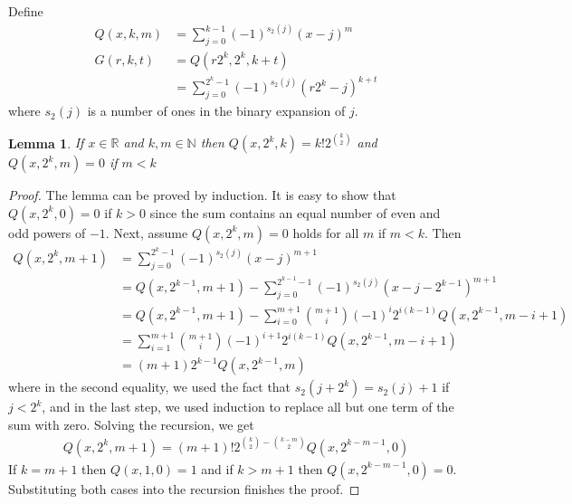 \documentclass{article}
\newtheorem{lemma}{Lemma}
\begin{document}
Define
\begin{align}
Q(x, k, m)
&=
  \sum_{j=0}^{k-1}
    (-1)^{s_2(j)}
    \left(x-j\right)^{m} \\
G(r, k, t) 
&= Q(r2^k, 2^k, k+t) \label{eq:G-def} \\
&=
  \sum_{j=0}^{2^k-1}
    (-1)^{s_2(j)}
    \left(r2^{k}-j\right)^{k+t} 
\end{align}
where $s_2(j)$ is a number of ones in the binary expansion of $j$.

\begin{lemma}
\label{lemma:q-zeros}
If $x \in \mathbb{R}$ and $k, m \in \mathbb{N}$ then $Q(x, 2^k, k) = k!2^{\binom{k}{2}}$ and $Q(x, 2^k, m)=0$ if $m < k$
\end{lemma}
\begin{proof}
The lemma can be proved by induction. It is easy to show that $Q(x, 2^{k}, 0)=0$ if $k > 0$ since the sum contains an equal number of even and odd powers of $-1$. Next, assume $Q(x, 2^k, m)=0$ holds for all $m$ if $m < k$. Then
\begin{align*}
Q(x, 2^{k}, m+1)
&=
  \sum_{j=0}^{2^{k}-1}
    (-1)^{s_2(j)}
    (x-j)^{m+1} \\
&=
  Q(x, 2^{k-1}, m+1)
  -
  \sum_{j=0}^{2^{k-1}-1}
    (-1)^{s_2(j)}
    (x-j-2^{k-1})^{m+1} \\
&=
  Q(x, 2^{k-1}, m+1)
  -
  \sum_{i=0}^{m+1}
    \binom{m+1}{i}
    (-1)^i
    2^{i(k-1)}
    Q(x, 2^{k-1}, m-i+1) \\
&=
  \sum_{i=1}^{m+1}
    \binom{m+1}{i}
    (-1)^{i+1}
    2^{i(k-1)}
    Q(x, 2^{k-1}, m-i+1) \\
&=
  (m+1)
  2^{k-1}
  Q(x, 2^{k-1}, m)
\end{align*}
where in the second equality, we used the fact that $s_2(j+2^k) = s_2(j)+1$ if $j < 2^k$, and in the last step, we used induction to replace all but one term of the sum with zero. Solving the recursion, we get
\begin{align*}
    Q(x, 2^k, m+1) = (m+1)! 2^{\binom{k}{2} - \binom{k-m}{2}} Q(x, 2^{k-m-1}, 0)
\end{align*}
If $k=m+1$ then $Q(x, 1, 0) = 1$ and if $k > m+1$ then $Q(x, 2^{k-m-1},0) = 0$. Substituting both cases into the recursion finishes the proof.
\end{proof}
\end{document}
